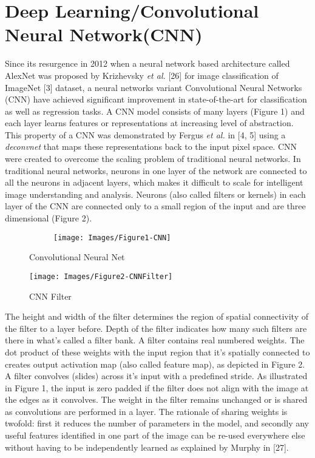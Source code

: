 \documentclass [11pt,letterpaper ,twoside ,openany ]{report}
\begin{document}
    \chapter{Deep Learning/Convolutional Neural Network(CNN)}
    \doublespacing
    Since its resurgence in 2012 when a neural network based architecture called AlexNet was proposed by Krizhevsky \textit {et al.} [26] for image classification of ImageNet [3] dataset, a neural networks variant Convolutional Neural Networks (CNN) have achieved significant improvement in state-of-the-art for classification as well as regression tasks. A CNN model consists of many layers (Figure 1) and each layer learns features or representations at increasing level of abstraction. This property of a CNN was demonstrated by Fergus \textit{et al.} in [4, 5] using a \textit{deconvnet} that maps these representations back to the input pixel space. CNN were created to overcome the scaling problem of traditional neural networks. In traditional neural networks, neurons in one layer of the network are connected to all the neurons in adjacent layers, which makes it difficult to scale for intelligent image understanding and analysis.  Neurons (also called filters or kernels) in each layer of the CNN are connected only to a small region of the input and are three dimensional (Figure 2). 

    \begin{figure}[h]
      \centering
      \begin{subfigure}[b]{0.90\linewidth}
        \texttt{[image: Images/Figure1-CNN]}
      \end{subfigure}
      \caption{Convolutional Neural Net}
      \label{fig:cnn}
    \end{figure}


    \begin{wrapfigure}{l}{0.5\textwidth}
        \begin{center}
            \texttt{[image: Images/Figure2-CNNFilter]}
        \end{center}
        \caption{CNN Filter}
    \end{wrapfigure}

    The height and width of the filter determines the region of spatial connectivity of the filter to a layer before. Depth of the filter indicates how many such filters are there in what's called a filter bank. A filter contains real numbered weights. The dot product of these weights with the input region that it's spatially connected to creates output activation map (also called feature map), as depicted in Figure 2. A filter convolves (slides) across it's input with a predefined stride. As illustrated in Figure 1, the input is zero padded if the filter  does not align with the image at the edges as it convolves. The weight in the filter remains unchanged or is shared as convolutions are performed in a layer. The rationale of sharing weights is twofold: first it reduces the number of parameters in the model, and secondly any useful features identified in one part of the image can be re-used everywhere else without having to be independently learned as explained by Murphy in [27].\\
\end{document}
